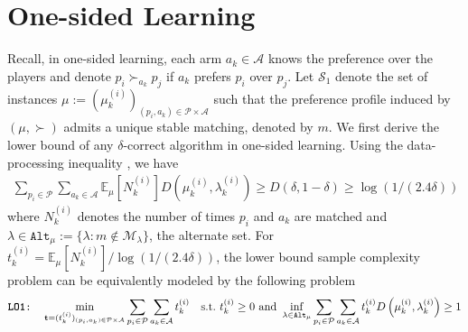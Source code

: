 \documentclass{article}
\newcommand{\E}{\mathbb{E}}
\begin{document}
\section{One-sided Learning}
Recall, in one-sided learning, each arm $a_k\in \mathcal{A}$ knows the preference over the players and denote $p_i\succ_{a_k}p_j$ if $a_k$ prefers $p_i$ over $p_j$. Let $\mathcal{S}_1$ denote the set of instances $\mu := (\mu^{(i)}_k)_{(p_i,a_k) \in \mathcal{P} \times \mathcal{A}}$ such that the preference profile induced by $(\mu, \succ)$ admits a unique stable matching, denoted by $m$. We first derive the lower bound of any $\delta$-correct algorithm  in one-sided learning.  Using the data-processing inequality \cite{kaufmann2020contributions}, we have
\begin{align}
\sum_{p_i\in\mathcal{P}}\sum_{a_k\in\mathcal{A}}\E_{\mu}[N^{(i)}_k] D\left(\mu^{(i)}_k,\lambda^{(i)}_k\right)\geq D(\delta,1-\delta)\geq \log(1/(2.4\delta))
\end{align}
where $N^{(i)}_k$ denotes the number of times $p_i$ and $a_k$ are matched and $\lambda\in \texttt{Alt}_{\mu}:=\{\lambda:m\not\in\mathcal{M}_{\lambda}\}$, the alternate set. For $t^{(i)}_k = \E_{\mu}[N^{(i)}_k]/\log(1/(2.4\delta)) $, the lower bound sample complexity problem can be equivalently modeled by the following problem
\begin{align*}
  \texttt{\textbf{LO1}:} \quad \min_{\mathbf{t}=(t^{(i)}_k)_{(p_i,a_k)\in\mathcal{P}\times\mathcal{A}}} \sum_{p_i\in\mathcal{P}}\sum_{a_k\in\mathcal{A}} t^{(i)}_k \quad\text{s.t.}\ t^{(i)}_k\geq 0\ \text{and}\ 
\inf_{\lambda\in\texttt{Alt}_{\mu}}\sum_{p_i\in\mathcal{P}}\sum_{a_k\in\mathcal{A}}t^{(i)}_kD\left(\mu^{(i)}_k,\lambda^{(i)}_k\right)\geq 1
\end{align*}
\end{document}
